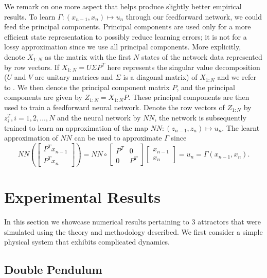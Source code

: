 We remark on one more aspect that helps produce slightly better empirical results.  To learn $\Gamma: (x_{n-1},x_{n}) \mapsto u_n$ through our feedforward network, we could feed the principal components. 
Principal components are used only for a more efficient state representation to possibly reduce learning errors; it is not for a lossy approximation since we use all principal components.
More explicitly, denote $X_{1:N}$ as the matrix with the first $N$ states of the network data represented by row vectors. If $X_{1:N}=U\Sigma P^T$ here represents the singular value decomposition ($U$ and $V$ are unitary matrices and $\Sigma$ is a diagonal matrix) of $X_{1:N}$ and we refer to \cite{wikiSVdecomp}. We then denote the principal component matrix $P$, and the principal components are given by 
 $Z_{1:N}=X_{1:N}P$.
These principal components are then used to train a feedforward neural network. Denote the row vectors of $Z_{1:N}$ by 
$z_i^T, i=1,2,\ldots,N$ and the neural network by $NN$, the network is subsequently trained to learn an approximation of the map
$NN: (z_{n-1},z_n) \mapsto  u_n.
$
The learnt approximation of $NN$ can be used to approximate $\Gamma$ since 
\begin{equation}\label{Seq_RNN}
  NN\left( \begin{bmatrix} 
    P^Tx_{n-1} \\
    P^Tx_n
    \end{bmatrix}
    \right) = NN \circ 
    \begin{bmatrix}
    P^T & 0 \\
    0 & P^T 
    \end{bmatrix}\begin{bmatrix}
    x_{n-1}\\
    x_n
    \end{bmatrix} = u_n = \Gamma(x_{n-1},x_n).
\end{equation}


\section{Experimental Results}
In this section we showcase numerical results pertaining to 3 attractors that were simulated using the theory and methodology described. We first consider a simple physical system that exhibits complicated dynamics.
\subsection{Double Pendulum}

